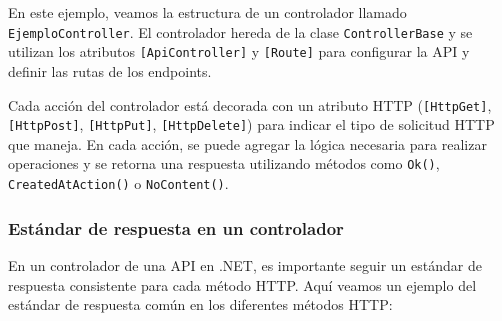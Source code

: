 \documentclass[executivepaper]{article}
\begin{document}
En este ejemplo, veamos la estructura de un controlador llamado \lstinline{EjemploController}. El controlador hereda de la clase \lstinline{ControllerBase} y se utilizan los atributos \lstinline{[ApiController]} y \lstinline{[Route]} para configurar la API y definir las rutas de los endpoints.

Cada acción del controlador está decorada con un atributo HTTP (\lstinline{[HttpGet]}, \lstinline{[HttpPost]}, \lstinline{[HttpPut]}, \lstinline{[HttpDelete]}) para indicar el tipo de solicitud HTTP que maneja. En cada acción, se puede agregar la lógica necesaria para realizar operaciones y se retorna una respuesta utilizando métodos como \lstinline{Ok()}, \lstinline{CreatedAtAction()} o \lstinline{NoContent()}.

\subsubsection{Estándar de respuesta en un controlador}

En un controlador de una API en .NET, es importante seguir un estándar de respuesta consistente para cada método HTTP. Aquí veamos un ejemplo del estándar de respuesta común en los diferentes métodos HTTP:
\end{document}
